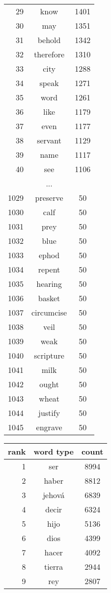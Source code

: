 \begin{figure*}
\begin{tiny}
\begin{centering}
\begin{tabular}{|r|c|c|}
29 & know & 1401 \\
30 & may & 1351 \\
31 & behold & 1342 \\
32 & therefore & 1310 \\
33 & city & 1288 \\
34 & speak & 1271 \\
35 & word & 1261 \\
36 & like & 1179 \\
37 & even & 1177 \\
38 & servant & 1129 \\
39 & name & 1117 \\
40 & see & 1106 \\
    \multicolumn{3}{|c|}{...} \\ 
1029 & preserve & 50 \\
1030 & calf & 50 \\
1031 & prey & 50 \\
1032 & blue & 50 \\
1033 & ephod & 50 \\
1034 & repent & 50 \\
1035 & hearing & 50 \\
1036 & basket & 50 \\
1037 & circumcise & 50 \\
1038 & veil & 50 \\
1039 & weak & 50 \\
1040 & scripture & 50 \\
1041 & milk & 50 \\
1042 & ought & 50 \\
1043 & wheat & 50 \\
1044 & justify & 50 \\
1045 & engrave & 50 \\
    \hline
  \end{tabular}
  \quad
  \begin{tabular}{|r|c|c|}
    \hline
    rank & word type & count \\
    \hline
1 & ser & 8994 \\
2 & haber & 8812 \\
3 & jehová & 6839 \\
4 & decir & 6324 \\
5 & hijo & 5136 \\
6 & dios & 4399 \\
7 & hacer & 4092 \\
8 & tierra & 2944 \\
9 & rey & 2807 \\

\end{tabular}
\end{centering}
\end{tiny}
\end{figure*}
